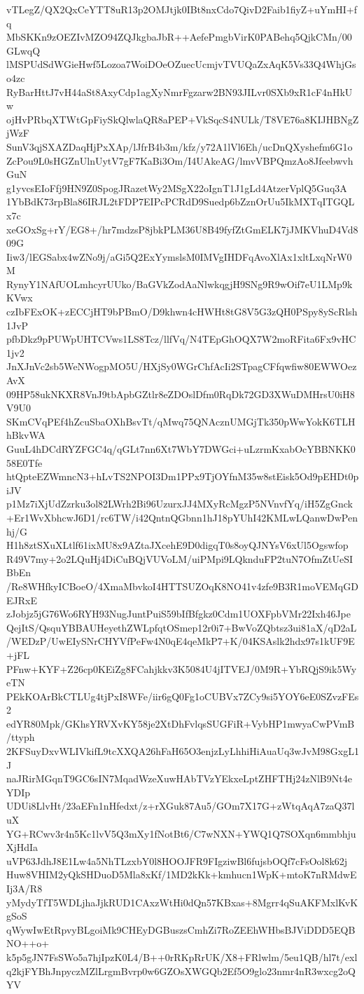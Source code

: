 vTLegZ/QX2QxCeYTT8uR13p2OMJtjk0IBt8nxCdo7QivD2Faib1fiyZ+uYmHI+fq
MbSKKn9zOEZIvMZO94ZQJkgbaJbR++AefePmgbVirK0PABehq5QjkCMn/00GLwqQ
lMSPUdSdWGieHwf5Lozoa7WoiDOeOZuecUcmjvTVUQaZxAqK5Vs33Q4WhjGso4zc
RyBarHttJ7vH44aSt8AxyCdp1agXyNmrFgzarw2BN93JILvr0SXb9xR1cF4nHkUw
ojHvPRbqXTWtGpFiySkQlwlaQR8aPEP+VkSqcS4NULk/T8VE76a8KIJHBNgZjWzF
SunV3qjSXAZDaqHjPxXAp/lJfrB4b3m/kfz/y72A1lVl6Eh/ucDnQXyshefm6G1o
ZcPou9L0sHGZnUlnUytV7gF7KaBi3Om/I4UAkeAG/lmvVBPQmzAo8JfeebwvhGuN
g1yvcsEIoFfj9HN9Z0SpogJRazetWy2MSgX22oIgnT1J1gLd4AtzerVplQ5Guq3A
1YbBdK73rpBla86IRJL2tFDP7EIPcPCRdD9Suedp6bZznOrUu5IkMXTqITGQLx7c
xeGOxSg+rY/EG8+/hr7mdzsP8jbkPLM36U8B49fyfZtGmELK7jJMKVhuD4Vd809G
Iiw3/lEGSabx4wZNo9j/aGi5Q2ExYymslsM0IMVgIHDFqAvoXlAx1xltLxqNrW0M
RynyY1NAfUOLmhcyrUUko/BaGVkZodAaNlwkqgjH9SNg9R9wOif7eU1LMp9kKVwx
czIbFExOK+zECCjHT9bPBmO/D9khwn4cHWHt8tG8V5G3zQH0PSpy8yScRlsh1JvP
pfbDkz9pPUWpUHTCVws1LS8Tcz/llfVq/N4TEpGhOQX7W2moRFita6Fx9vHC1jv2
JnXJnVc2sb5WeNWogpMO5U/HXjSy0WGrChfAcIi2STpagCFfqwfiw80EWWOezAvX
09HP58ukNKXR8VnJ9tbApbGZtlr8eZDOslDfm0RqDk72GD3XWuDMHrsU0iH8V9U0
SKmCVqPEf4hZcuSbaOXhBsvTt/qMwq75QNAcznUMGjTk350pWwYokK6TLHhBkvWA
GuuL4hDCdRYZFGC4q/qGLt7nn6Xt7WbY7DWGci+uLzrmKxabOcYBBNKK058E0Tfe
htQpteEZWmncN3+hLvTS2NPOI3Dm1PPx9TjOYfnM35w8stEisk5Od9pEHDt0piJV
p1Mz7iXjUdZzrku3ol82LWrh2Bi96UzurxJJ4MXyRcMgzP5NVnvfYq/iH5ZgGnck
+Er1WvXbhcwJ6D1/rc6TW/i42QntnQGbnn1hJ18pYUhI42KMLwLQanwDwPenhj/G
H1h8ztSXuXLtlf61ixMU8x9AZtaJXcehE9D0digqT0s8oyQJNYsV6xUl5Ogswfop
R49V7my+2o2LQuHj4DiCuBQjVUVoLM/uiPMpi9LQknduFP2tuN7OfmZtUeSIBbEn
/Re8WHfkyICBoeO/4XmaMbvkoI4HTTSUZOqK8NO41v4zfe9B3R1moVEMqGDEJRxE
zJobjz5jG76Wo6RYH93NugJuntPuiS59bIfBfgkz0Cdm1UOXFpbVMr22Ixh46Jpe
QejItS/QsquYBBAUHeyethZWLpfqtOSmep12r0i7+BwVoZQbtsz3ui81aX/qD2aL
/WEDzP/UwEIySNrCHYVfPeFw4N0qE4qeMkP7+K/04KSAslk2hdx97s1kUF9E+jFL
PFnw+KYF+Z26cp0KEiZg8FCahjkkv3K5084U4jITVEJ/0M9R+YbRQjS9ik5WyeTN
PEkKOArBkCTLUg4tjPxI8WFe/iir6gQ0Fg1oCUBVx7ZCy9si5YOY6eE0SZvzFEs2
edYR80Mpk/GKhsYRVXvKY58je2XtDhFvlqsSUGFiR+VybHP1mwyaCwPVmB/ttyph
2KFSuyDxvWLIVkifL9tcXXQA26hFaH65O3enjzLyLhhiHiAuaUq3wJvM98GxgL1J
naJRirMGqnT9GC6sIN7MqadWzeXuwHAbTVzYEkxeLptZHFTHj24zNlB9Nt4eYDIp
UDUi8LlvHt/23aEFn1nHfedxt/z+rXGuk87Au5/GOm7X17G+zWtqAqA7zaQ37luX
YG+RCwv3r4n5Kc1lvV5Q3mXy1fNotBt6/C7wNXN+YWQ1Q7SOXqn6mmbhjuXjHdIa
uVP63JdhJ8E1Lw4a5NhTLzxbY0l8HOOJFR9FIgziwBl6fujsbOQf7cFsOol8k62j
Huw8VHIM2yQkSHDuoD5Mla8xKf/1MD2kKk+kmhucn1WpK+mtoK7nRMdwEIj3A/R8
yMydyTfT5WDLjhaJjkRUD1CAxzWtHi0dQn57KBxas+8Mgrr4qSuAKFMxlKvKgSoS
qWywIwEtRpvyBLgoiMk9CHEyDGBuszsCmhZi7RoZEEhWHbsBJViDDD5EQBNO++o+
k5p5gJN7FsSWo5a7hjIpzK0L4/B++0rRKpRrUK/X8+FRlwlm/5eu1QB/hl7t/exl
q2kjFYBhJnpyczMZlLrgmBvrp0w6GZOsXWGQb2Ef5O9glo23nmr4nR3wxcg2oQYV
